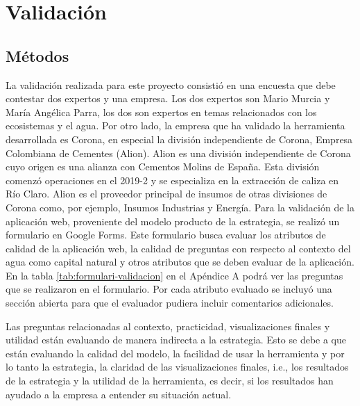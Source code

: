 \section{Validación}
\subsection{Métodos}
La validación realizada para este proyecto consistió en una encuesta que debe contestar dos expertos y una empresa. Los dos expertos son Mario Murcia y María Angélica Parra, los dos son expertos en temas relacionados con los ecosistemas y el agua. Por otro lado, la empresa que ha validado la herramienta desarrollada es Corona, en especial la división independiente de Corona, Empresa Colombiana de Cementes (Alion). Alion es una división independiente de Corona cuyo origen es una alianza con Cementos Molins de España. Esta división comenzó operaciones en el 2019-2 y se especializa en la extracción de caliza en Río Claro. Alion es el proveedor principal de insumos de otras divisiones de Corona como, por ejemplo, Insumos Industrias y Energía. 
Para la validación de la aplicación web, proveniente del modelo producto de la estrategia, se realizó un formulario en Google Forms. Este formulario busca evaluar los atributos de calidad de la aplicación web, la calidad de preguntas con respecto al contexto del agua como capital natural y otros atributos que se deben evaluar de la aplicación. En la tabla \ref{tab:formulari-validacion} en el Apéndice A podrá ver las preguntas que se realizaron en el formulario. Por cada atributo evaluado se incluyó una sección abierta para que el evaluador pudiera incluir comentarios adicionales.

Las preguntas relacionadas al contexto, practicidad, visualizaciones finales y utilidad están evaluando de manera indirecta a la estrategia. Esto se debe a que están evaluando la calidad del modelo, la facilidad de usar la herramienta y por lo tanto la estrategia, la claridad de las visualizaciones finales, i.e., los resultados de la estrategia y la utilidad de la herramienta, es decir, si los resultados han ayudado a la empresa a entender su situación actual.

